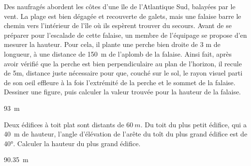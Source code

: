 \documentclass[12pt,french,oneside,a4paper]{memoir} %
\begin{document}
\begin{exo}
 Des naufragés abordent les côtes d'une île
  de l'Atlantique Sud, balayées par le vent. La plage est bien dégagée et recouverte de
  galets, mais une falaise barre le chemin vers l'intérieur de l'île
  où ils espèrent trouver du secours.  Avant de se préparer pour
  l'escalade de cette falaise, un membre de l'équipage se propose d'en
  mesurer la hauteur. Pour cela, il plante une perche bien droite de 3
  m de longueur, à une distance de \SI{150}{\metre} de l'aplomb de la falaise.
  Ainsi fait, après avoir vérifié que la perche est bien
  perpendiculaire au plan de l'horizon, il recule de 5m, distance
  juste nécessaire pour que, couché sur le sol, le rayon visuel parti
  de son oeil effleure à la fois l'extrémité de la perche et le sommet
  de la falaise.  Dessiner une figure, puis calculer la valeur trouvée
  pour la hauteur de la falaise.
  \begin{correction}
    \SI{93}{m}
\end{correction}
\end{exo}

\begin{exo}
  Deux édifices à toit plat sont distants de $\SI{60}{m}$. Du toit
  du plus petit édifice, qui a \SI{40}{m} de hauteur, l'angle
  d'élévation de l'arête du toît du plus grand édifice est de
  \ang{40}. Calculer la hauteur du plus grand édifice.
  \begin{center}
    
  \end{center}
  \begin{correction}
    \SI{90,35}{m}
\end{correction}
\end{exo}
\end{document}

